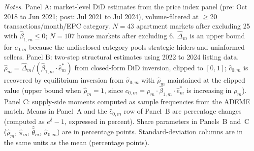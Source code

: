\documentclass[10pt,letterpaper]{bp-template-concise}
\begin{document}
\begin{table}[H]
\begin{minipage}{\linewidth}
\footnotesize\textit{Notes.} Panel A: market-level DiD estimates from the price index panel (pre: Oct 2018 to Jun 2021; post: Jul 2021 to Jul 2024), volume-filtered at $\geq 20$ transactions/month/EPC category. $N=43$ apartment markets after excluding 25 with $\hat\beta_{1,m}\leq 0$; $N=107$ house markets after excluding 6. $\hat\Delta_m$ is an upper bound for $c_{0,m}$ because the undisclosed category pools strategic hiders and uninformed sellers. Panel B: two-step structural estimates using 2022 to 2024 listing data. $\hat\rho_m = \hat\Delta_m / (\hat\beta_{1,m} \cdot \hat{e}^*_m)$ from closed-form DiD inversion, clipped to $[0,1]$; $\hat{c}_{0,m}$ is recovered by equilibrium inversion from $\hat\sigma_{0,m}$ with $\hat\rho_m$ maintained at the clipped value (upper bound when $\hat\rho_m = 1$, since $c_{0,m} = \rho_m\cdot\hat\beta_{1,m}\cdot\hat{e}^*_m$ is increasing in $\rho_m$). Panel C: supply-side moments computed as sample frequencies from the ADEME match. Means in Panel~A and the $\hat c_{0,m}$ row of Panel~B are percentage changes (computed as $e^\delta - 1$, expressed in percent). Share parameters in Panels~B and~C ($\hat\rho_m$, $\hat\pi_m$, $\hat{\bar\theta}_m$, $\hat\sigma_{0,m}$) are in percentage points. Standard-deviation columns are in the same units as the mean (percentage points).
\end{minipage}
\end{table}

\vspace{-1em}
\end{document}
